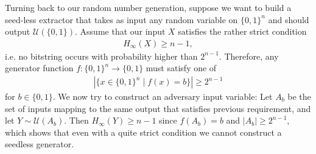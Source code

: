 Turning back to our random number generation,
suppose we want to build a seed-less extractor
that takes as input any random variable on $\{0,1\}^n$
and should output $\mathcal U(\{0,1\})$.
Assume that our input $X$ satisfies the rather strict condition
\begin{align} \label{eq:naive_extractor_req}
    H_\infty(X) \geq n-1,
\end{align}
i.e. no bitstring occurs with probability higher than $2^{n-1}$.
Therefore, any generator function $f:\{0,1\}^n \rightarrow \{0,1\}$ must satisfy one of
\begin{align*}
    |\{x \in \{0,1\}^n \mid f(x)=b\}| \geq 2^{n-1}
\end{align*}
for $b \in \{0,1\}$.
We now try to construct an adversary input variable:
Let $A_b$ be the set of inputs mapping to the same output that satisfies previous requirement,
and let $Y \sim \mathcal U(A_b)$.
Then $H_\infty(Y) \geq n-1$ since $f(A_b) = b$ and $|A_b| \geq 2^{n-1}$,
which shows that even with a quite strict condition we cannot construct a seedless generator.